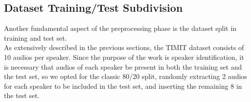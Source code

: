 \subsection{Dataset Training/Test Subdivision}
\label{sec:train_test_subdivision}

Another fundamental aspect of the preprocessing phase is the dataset split in training and test set.
\\As extensively described in the previous sections, the TIMIT dataset consists of 10 audios per speaker. Since the purpose of the work is speaker identification, it is necessary that audios of each speaker be present in both the training set and the test set, so we opted for the classic 80/20 split, randomly extracting 2 audios for each speaker to be included in the test set, and inserting the remaining 8 in the test set.